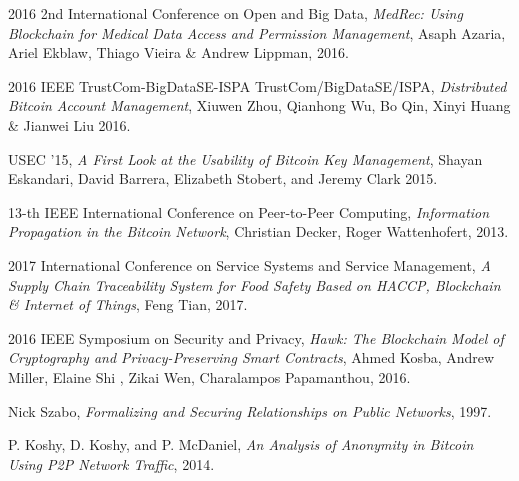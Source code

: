 \begin{thebibliography}{1}
  2016 2nd International Conference on Open and Big Data,
  \emph{MedRec: Using Blockchain for Medical Data Access and Permission
Management},
  Asaph Azaria, Ariel Ekblaw, Thiago Vieira \& Andrew Lippman,
  2016.

  2016 IEEE TrustCom-BigDataSE-ISPA TrustCom/BigDataSE/ISPA,
  \emph{Distributed Bitcoin Account Management},
  Xiuwen Zhou, Qianhong Wu, Bo Qin, Xinyi Huang \& Jianwei Liu
  2016.

  USEC ’15,
  \emph{A First Look at the Usability of Bitcoin Key Management},
  Shayan Eskandari, David Barrera, Elizabeth Stobert, and Jeremy Clark
  2015.

  13-th IEEE International Conference on Peer-to-Peer Computing,
  \emph{Information Propagation in the Bitcoin Network},
  Christian Decker, Roger Wattenhofert,
  2013.

  2017 International Conference on Service Systems and Service Management,
  \emph{A Supply Chain Traceability System for Food Safety
Based on HACCP, Blockchain \& Internet of Things},
  Feng Tian,
  2017.

  2016 IEEE Symposium on Security and Privacy,
  \emph{Hawk: The Blockchain Model of Cryptography and Privacy-Preserving Smart
Contracts},
  Ahmed Kosba, Andrew Miller, Elaine Shi , Zikai Wen, Charalampos Papamanthou,
  2016.

   Nick Szabo,
  \emph{Formalizing and Securing Relationships on Public Networks},
  1997.

   P. Koshy, D. Koshy, and P. McDaniel,
  \emph{An Analysis of Anonymity in Bitcoin Using P2P Network Traffic},
  2014.

\end{thebibliography}

